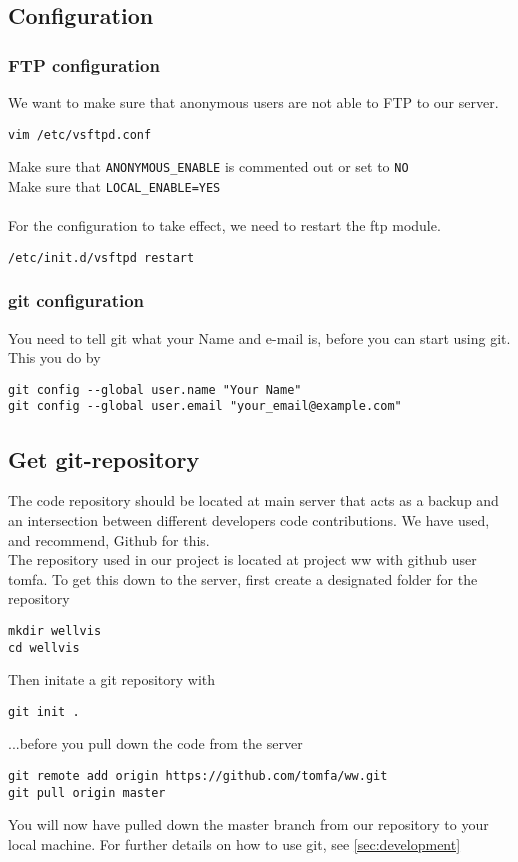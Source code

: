 \documentclass{report}
\begin{document}
\subsection{Configuration}
\subsubsection{FTP configuration}
We want to make sure that anonymous users are not able to FTP to our server.
\begin{verbatim}
vim /etc/vsftpd.conf
\end{verbatim}
Make sure that \verb|ANONYMOUS_ENABLE| is commented out or set to \verb|NO|\\
Make sure that \verb|LOCAL_ENABLE=YES|\\\\
For the configuration to take effect, we need to restart the ftp module.
\begin{verbatim}
/etc/init.d/vsftpd restart
\end{verbatim}
\subsubsection{git configuration}
You need to tell git what your Name and e-mail is, before you can start using git. This you do by\cite{website:githelp}
\begin{verbatim}
git config --global user.name "Your Name"
git config --global user.email "your_email@example.com"
\end{verbatim}
\subsection{Get git-repository}
The code repository should be located at main server that acts as a backup and an intersection between different developers code contributions. We have used, and recommend, Github\cite{website:github} for this.\\ 
The repository used in our project is located at project ww with github user tomfa\cite{github_repository}. To get this down to the server, first create a designated folder for the repository
\begin{verbatim}
mkdir wellvis
cd wellvis
\end{verbatim}
Then initate a git repository with
\begin{verbatim}
git init .
\end{verbatim}
...before you pull down the code from the server
\begin{verbatim}
git remote add origin https://github.com/tomfa/ww.git
git pull origin master
\end{verbatim}
You will now have pulled down the master branch from our repository to your local machine. For further details on how to use git, see \ref{sec:development}
\end{document}
